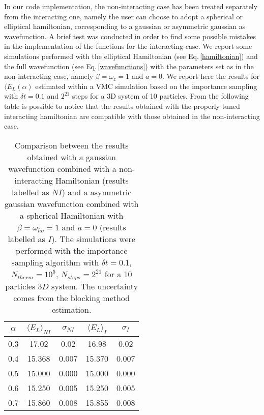 In our code implementation, the non-interacting case has been treated separately from the interacting one, namely the user can choose to adopt a spherical or elliptical hamiltonian, corresponding to a gaussian or asymmetric gaussian as wavefunction. A brief test was conducted in order to find some possible mistakes in the implementation of the functions for the interacting case. We report some simulations performed with the elliptical Hamiltonian (see Eq.\,\ref{hamiltonian}) and the full wavefunction (see Eq.\,\ref{wavefunctions}) with the parameters set as in the non-interacting case, namely $\beta=\omega_z=1$ and $a=0$. We report here the results for $\langle E_L(\alpha)$ estimated within a VMC simulation based on the importance sampling with $\delta t = 0.1$ and $2^{21}$ steps for a 3D system of 10 particles. From the following table is possible to notice that the results obtained with the properly tuned interacting hamiltonian are compatible with those obtained in the non-interacting case.  
\begin{table}[H]
    \centering
    \begin{tabular}{ccccc}
        \toprule
        $\alpha$ & $\langle E_L \rangle_{\textit{NI}}$ & $\sigma_{NI}$ & $\langle E_L \rangle_{\textit{I}}$ & $\sigma_{I}$  \\
        \midrule
        0.3 & 17.02  & 0.02 & 16.98 & 0.02 \\
        0.4 & 15.368 & 0.007 & 15.370 & 0.007 \\
        0.5 & 15.000 & 0.000 & 15.000 & 0.000 \\
        0.6 & 15.250 & 0.005 & 15.250 & 0.005 \\
        0.7 & 15.860 & 0.008 & 15.855 & 0.008 \\
        \bottomrule
    \end{tabular}
    \caption{Comparison between the results obtained with a gaussian wavefunction combined with a non-interacting Hamiltonian (results labelled as $NI$) and a asymmetric gaussian wavefunction combined with a spherical Hamiltonian with $\beta=\omega_{ho}=1$ and $a=0$ (results labelled as $I$). The simulations were performed with the importance sampling algorithm with $\delta t=0.1$, $N_{therm}=10^5$, $N_{steps}=2^{21}$ for a 10 particles $3D$ system. The uncertainty comes from the blocking method estimation. }
    \label{tab:matching between int case and non int}
\end{table}

